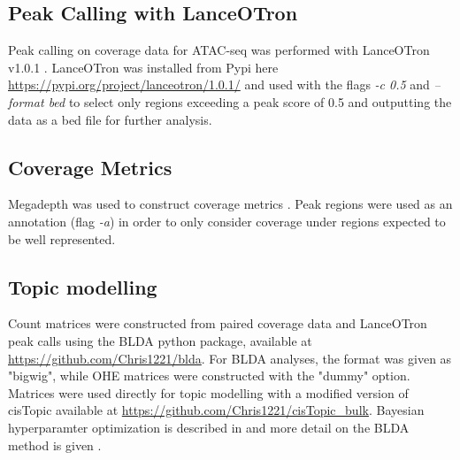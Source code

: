 \subsection{Peak Calling with LanceOTron}

Peak calling on coverage data for ATAC-seq was performed with LanceOTron v1.0.1 \cite{Hentges2021}. LanceOTron was installed from Pypi here \url{https://pypi.org/project/lanceotron/1.0.1/} and used with the flags \textit{-c 0.5} and \textit{--format bed} to select only regions exceeding a peak score of 0.5 and outputting the data as a bed file for further analysis. 

\subsection{Coverage Metrics}

Megadepth was used to construct coverage metrics \cite{Wilks2021}. Peak regions were used as an annotation (flag \textit{-a}) in order to only consider coverage under regions expected to be well represented.

\subsection{Topic modelling}

Count matrices were constructed from paired coverage data and LanceOTron peak calls using the BLDA python package, available at \url{https://github.com/Chris1221/blda}. For BLDA analyses, the format was given as "bigwig", while OHE matrices were constructed with the "dummy" option. Matrices were used directly for topic modelling with a modified version of cisTopic available at \url{https://github.com/Chris1221/cisTopic_bulk}. Bayesian hyperparamter optimization is described in  and more detail on the BLDA method is given .



